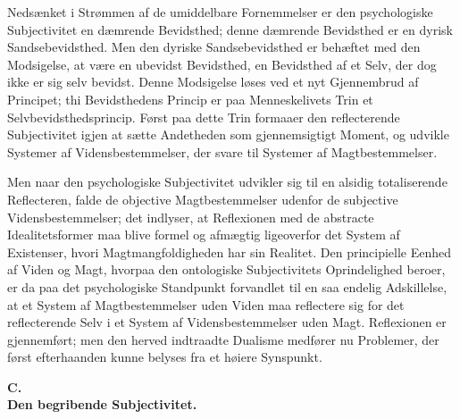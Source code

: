 \documentclass[12pt]{book}
\newcommand{\opage}[1]{\marginnote{\footnotesize\textit{[#1]}}}
\begin{document}
Nedsænket i Strømmen af de umiddelbare Fornemmelser er den psychologiske Subjectivitet en
dæmrende Bevidsthed; denne dæmrende Bevidsthed er en dyrisk Sandsebevidsthed. Men den
dyriske Sandsebevidsthed er behæftet med den Modsigelse, at være en ubevidst Bevidsthed,
en Bevidsthed af et Selv, der dog ikke er sig selv bevidst. Denne Modsigelse løses ved et
nyt Gjennembrud af Principet; thi Bevidsthedens Princip er paa Menneskelivets Trin et
Selvbevidsthedsprincip. Først paa dette Trin formaaer den reflecterende Subjectivitet
\opage{133} igjen at sætte Andetheden som gjennemsigtigt Moment, og udvikle Systemer af
Vidensbestemmelser, der svare til Systemer af Magtbestemmelser.

Men naar den psychologiske Subjectivitet udvikler sig til en alsidig totaliserende
Reflecteren, falde de objective Magtbestemmelser udenfor de subjective Vidensbestemmelser;
det indlyser, at Reflexionen med de abstracte Idealitetsformer maa blive formel og
afmægtig ligeoverfor det System af Existenser, hvori Magtmangfoldigheden har sin Realitet.
Den principielle Eenhed af Viden og Magt, hvorpaa den ontologiske Subjectivitets
Oprindelighed beroer, er da paa det psychologiske Standpunkt forvandlet til en saa endelig
Adskillelse, at et System af Magtbestemmelser uden Viden maa reflectere sig for det
reflecterende Selv i et System af Vidensbestemmelser uden Magt. Reflexionen er
gjennemført; men den herved indtraadte Dualisme medfører nu Problemer, der først
efterhaanden kunne belyses fra et høiere Synspunkt.

\begin{center}
{\bfseries C.}\\[2pt]
{\large\bfseries Den begribende Subjectivitet.}
\end{center}
\end{document}
